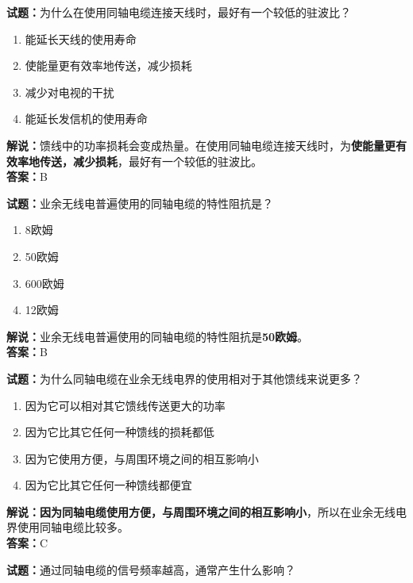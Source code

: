 \documentclass{ctexbook}
\begin{document}
\noindent\textbf{试题：}为什么在使用同轴电缆连接天线时，最好有一个较低的驻波比？

\begin{enumerate}[leftmargin=3em]
  \item 能延长天线的使用寿命
  \item 使能量更有效率地传送，减少损耗
  \item 减少对电视的干扰
  \item 能延长发信机的使用寿命
\end{enumerate}

\noindent\textbf{解说：}馈线中的功率损耗会变成热量。在使用同轴电缆连接天线时，为\textbf{使能量更有效率地传送，减少损耗}，最好有一个较低的驻波比。\\\noindent\textbf{答案：}B

\bigskip

\noindent\textbf{试题：}业余无线电普遍使用的同轴电缆的特性阻抗是？

\begin{enumerate}[leftmargin=3em]
  \item 8欧姆
  \item 50欧姆
  \item 600欧姆
  \item 12欧姆
\end{enumerate}

\noindent\textbf{解说：}业余无线电普遍使用的同轴电缆的特性阻抗是\textbf{50欧姆}。\\\noindent\textbf{答案：}B

\bigskip

\noindent\textbf{试题：}为什么同轴电缆在业余无线电界的使用相对于其他馈线来说更多？

\begin{enumerate}[leftmargin=3em]
  \item 因为它可以相对其它馈线传送更大的功率
  \item 因为它比其它任何一种馈线的损耗都低
  \item 因为它使用方便，与周围环境之间的相互影响小
  \item 因为它比其它任何一种馈线都便宜
\end{enumerate}

\noindent\textbf{解说：}\textbf{因为同轴电缆使用方便，与周围环境之间的相互影响小}，所以在业余无线电界使用同轴电缆比较多。\\\noindent\textbf{答案：}C

\bigskip

\noindent\textbf{试题：}通过同轴电缆的信号频率越高，通常产生什么影响？
\end{document}
